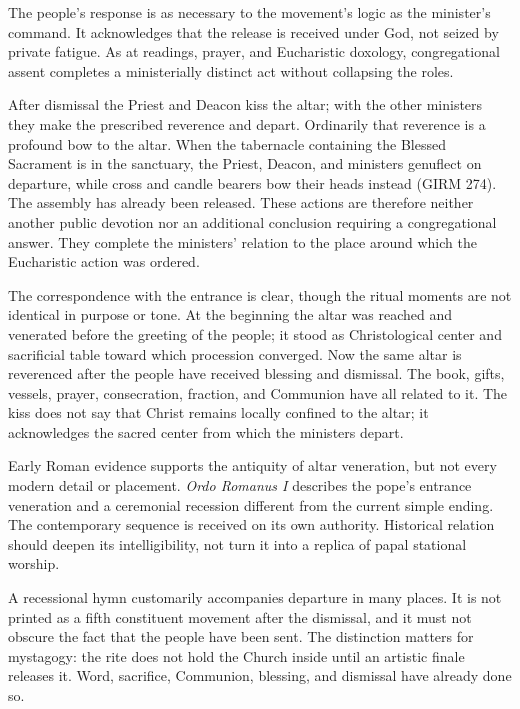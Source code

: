 The people's response is as necessary to the movement's logic as the minister's command. It acknowledges that the release is received under God, not seized by private fatigue. As at readings, prayer, and Eucharistic doxology, congregational assent completes a ministerially distinct act without collapsing the roles.


After dismissal the Priest and Deacon kiss the altar; with the other ministers they make the prescribed reverence and depart. Ordinarily that reverence is a profound bow to the altar. When the tabernacle containing the Blessed Sacrament is in the sanctuary, the Priest, Deacon, and ministers genuflect on departure, while cross and candle bearers bow their heads instead (GIRM 274). The assembly has already been released. These actions are therefore neither another public devotion nor an additional conclusion requiring a congregational answer. They complete the ministers' relation to the place around which the Eucharistic action was ordered.

The correspondence with the entrance is clear, though the ritual moments are not identical in purpose or tone. At the beginning the altar was reached and venerated before the greeting of the people; it stood as Christological center and sacrificial table toward which procession converged. Now the same altar is reverenced after the people have received blessing and dismissal. The book, gifts, vessels, prayer, consecration, fraction, and Communion have all related to it. The kiss does not say that Christ remains locally confined to the altar; it acknowledges the sacred center from which the ministers depart.

Early Roman evidence supports the antiquity of altar veneration, but not every modern detail or placement. \emph{Ordo Romanus I} describes the pope's entrance veneration and a ceremonial recession different from the current simple ending. The contemporary sequence is received on its own authority. Historical relation should deepen its intelligibility, not turn it into a replica of papal stational worship.

A recessional hymn customarily accompanies departure in many places. It is not printed as a fifth constituent movement after the dismissal, and it must not obscure the fact that the people have been sent. The distinction matters for mystagogy: the rite does not hold the Church inside until an artistic finale releases it. Word, sacrifice, Communion, blessing, and dismissal have already done so.

